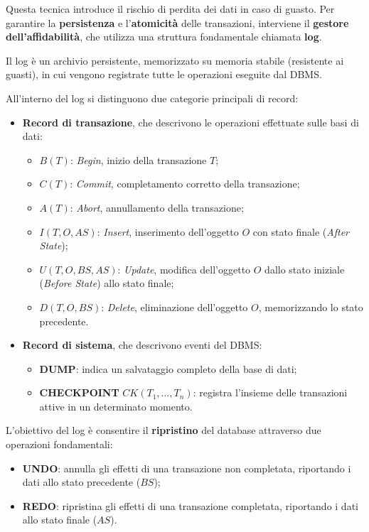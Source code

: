 Questa tecnica introduce il rischio di perdita dei dati in caso di guasto. 
Per garantire la \textbf{persistenza} e l'\textbf{atomicità} delle transazioni, interviene il \textbf{gestore dell'affidabilità}, che utilizza una struttura fondamentale chiamata \textbf{log}.

Il log è un archivio persistente, memorizzato su memoria stabile (resistente ai guasti), in cui vengono registrate tutte le operazioni eseguite dal DBMS.

All'interno del log si distinguono due categorie principali di record:

\begin{itemize}
	\item \textbf{Record di transazione}, che descrivono le operazioni effettuate sulle basi di dati:
	\begin{itemize}
		\item $B(T)$: \textit{Begin}, inizio della transazione $T$;
		\item $C(T)$: \textit{Commit}, completamento corretto della transazione;
		\item $A(T)$: \textit{Abort}, annullamento della transazione;
		\item $I(T, O, AS)$: \textit{Insert}, inserimento dell'oggetto $O$ con stato finale (\textit{After State});
		\item $U(T, O, BS, AS)$: \textit{Update}, modifica dell'oggetto $O$ dallo stato iniziale (\textit{Before State}) allo stato finale;
		\item $D(T, O, BS)$: \textit{Delete}, eliminazione dell'oggetto $O$, memorizzando lo stato precedente.
	\end{itemize}
	
	\item \textbf{Record di sistema}, che descrivono eventi del DBMS:
	\begin{itemize}
		\item \textbf{DUMP}: indica un salvataggio completo della base di dati;
		\item \textbf{CHECKPOINT} $CK(T_1, \dots, T_n)$: registra l'insieme delle transazioni attive in un determinato momento.
	\end{itemize}
\end{itemize}

L'obiettivo del log è consentire il \textbf{ripristino} del database attraverso due operazioni fondamentali:

\begin{itemize}
	\item \textbf{UNDO}: annulla gli effetti di una transazione non completata, riportando i dati allo stato precedente ($BS$);
	\item \textbf{REDO}: ripristina gli effetti di una transazione completata, riportando i dati allo stato finale ($AS$).
\end{itemize}

